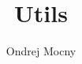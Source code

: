 \documentclass[12pt, a4paper]{article}
\begin{document}
\title{Utils}
\author{Ondrej Mocny}
\maketitle

\tableofcontents

\newpage


\end{document}

